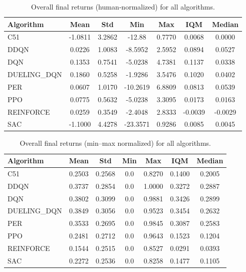 \begin{table}[htbp]
	\centering
	\caption{Overall final returns (human‐normalized) for all algorithms.}
	\label{tab:all_algo_eval_human}
	\begin{tabular}{lcccccc}
		\toprule
		\textbf{Algorithm} & \textbf{Mean} & \textbf{Std} & \textbf{Min} & \textbf{Max} & \textbf{IQM} & \textbf{Median} \\
		\midrule
		C51       & -1.0811 & 3.2862 & -12.88 & 0.7770 & 0.0068 & 0.0000 \\
		DDQN      & 0.0226  & 1.0083 & -8.5952 & 2.5952 & 0.0894 & 0.0527 \\
		DQN       & 0.1353  & 0.7541 & -5.0238 & 4.7381 & 0.1137 & 0.0338 \\
		DUELING\_DQN & 0.1860  & 0.5258 & -1.9286 & 3.5476 & 0.1020 & 0.0402 \\
		PER       & 0.0607  & 1.0170 & -10.2619 & 6.8809 & 0.0813 & 0.0539 \\
		PPO       & 0.0775  & 0.5632 & -5.0238 & 3.3095 & 0.0173 & 0.0163 \\
		REINFORCE & 0.0259  & 0.3549 & -2.4048 & 2.8333 & -0.0039 & -0.0029 \\
		SAC       & -1.1000 & 4.4278 & -23.3571 & 0.9286 & 0.0085 & 0.0045 \\
		\bottomrule
	\end{tabular}
\end{table}

\begin{table}[htbp]
	\centering
	\caption{Overall final returns (min--max normalized) for all algorithms.}
	\label{tab:all_algo_eval_minmax}
	\begin{tabular}{lcccccc}
		\toprule
		\textbf{Algorithm} & \textbf{Mean} & \textbf{Std} & \textbf{Min} & \textbf{Max} & \textbf{IQM} & \textbf{Median} \\
		\midrule
		C51       & 0.2503 & 0.2568 & 0.0 & 0.8270 & 0.1400 & 0.2005 \\
		DDQN      & 0.3737 & 0.2854 & 0.0 & 1.0000 & 0.3272 & 0.2887 \\
		DQN       & 0.3802 & 0.3099 & 0.0 & 0.9881 & 0.3426 & 0.2899 \\
		DUELING\_DQN & 0.3849 & 0.3056 & 0.0 & 0.9523 & 0.3454 & 0.2632 \\
		PER       & 0.3533 & 0.2695 & 0.0 & 0.9845 & 0.3087 & 0.2583 \\
		PPO       & 0.2481 & 0.2712 & 0.0 & 0.9643 & 0.1523 & 0.1204 \\
		REINFORCE & 0.1544 & 0.2515 & 0.0 & 0.8527 & 0.0291 & 0.0393 \\
		SAC       & 0.2272 & 0.2536 & 0.0 & 0.8258 & 0.1477 & 0.1105 \\
		\bottomrule
	\end{tabular}
\end{table}

